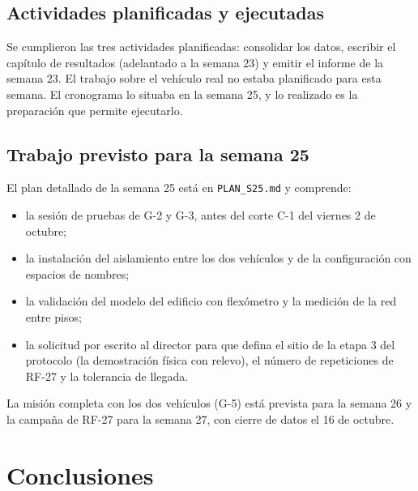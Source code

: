 \documentclass[12pt,letterpaper]{article}
\begin{document}
\subsection{Actividades planificadas y ejecutadas}

Se cumplieron las tres actividades planificadas: consolidar los datos, escribir el capítulo de resultados (adelantado a la semana 23) y emitir el informe de la semana 23. El trabajo sobre el vehículo real no estaba planificado para esta semana. El cronograma lo situaba en la semana 25, y lo realizado es la preparación que permite ejecutarlo.

\subsection{Trabajo previsto para la semana 25}

El plan detallado de la semana 25 está en \texttt{PLAN\_S25.md} y comprende:

\begin{itemize}[leftmargin=*]
    \item la sesión de pruebas de G-2 y G-3, antes del corte C-1 del viernes 2 de octubre;
    \item la instalación del aislamiento entre los dos vehículos y de la configuración con espacios de nombres;
    \item la validación del modelo del edificio con flexómetro y la medición de la red entre pisos;
    \item la solicitud por escrito al director para que defina el sitio de la etapa 3 del protocolo (la demostración física con relevo), el número de repeticiones de RF-27 y la tolerancia de llegada.
\end{itemize}

La misión completa con los dos vehículos (G-5) está prevista para la semana 26 y la campaña de RF-27 para la semana 27, con cierre de datos el 16 de octubre.

\section{Conclusiones}
\end{document}
